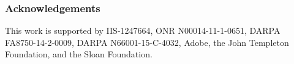\documentclass[]{article}
\begin{document}
\vspace*{-5pt}
\subsubsection*{Acknowledgements}
\vspace*{-5pt}
This work is supported by IIS-1247664, ONR N00014-11-1-0651, DARPA FA8750-14-2-0009, DARPA N66001-15-C-4032, Adobe, the John Templeton Foundation, and the Sloan Foundation.


\vspace*{-5pt}


%

\end{document}
